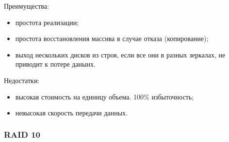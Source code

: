Преимущества:
\begin{itemize}
    \item простота реализации;
    \item простота восстановления массива в случае отказа (копирование);
    \item выход нескольких дисков из строя, если все они в разных зеркалах, не приводит к потере данынх.
\end{itemize}

Недостатки:
\begin{itemize}
    \item высокая стоимость на единицу объема. 100\% избыточность;
    \item невысокая скорость передачи данных.
\end{itemize}


\begin{frame}
    \frametitle{RAID 10}
    
    \begin{figure}
        \begin{center}
            \label{pict:raid10}
        \end{center}
    \end{figure} 
\end{frame}

